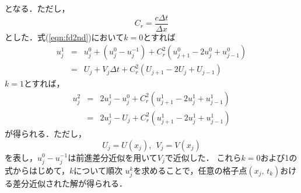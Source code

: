 \documentclass[10pt,a4j,dvipdfmx]{jarticle}
\begin{document}
となる．ただし，
\begin{equation}
	C_r=\frac{c \Delta t}{\Delta x}
	\label{eqn:}
\end{equation}
とした．式(\ref{eqn:fd2nd})において$k=0$とすれば
\begin{eqnarray}
	u^{1}_j 
	&=& 
	u^0_j+\left(u^0_j- u^{-1}_j\right)
	+C_r^2 \left( 
		u_{j+1}^0-2u_j^0 +u_{j-1}^0
	\right) \\ 
	&=&
	U_j+V_j\Delta t +C_r^2 \left( 
		U_{j+1}-2U_j +U_{j-1}
	\right) 
	\label{eqn:fd2nd_k0}
\end{eqnarray}
$k=1$とすれば，
\begin{eqnarray}
	u^{2}_j 
	&=& 
	2u^1_j- u^{0}_j
	+C_r^2 \left( 
		u_{j+1}^1-2u_j^1 +u_{j-1}^1
	\right)\\ 
	&=&
	2u^1_j- U_j
	+C_r^2 \left( 
		u_{j+1}^1-2u_j^1 +u_{j-1}^1
	\right) 
	\label{eqn:fd2nd_k0}
\end{eqnarray}
が得られる．ただし，
\begin{equation}
	U_j=U(x_j), \ \ V_j=V(x_j)
	\label{eqn:}
\end{equation}
を表し，$u^0_j-u^{-1}_j$は前進差分近似を用いて$V_j$で近似した．
これら$k=0$および1の式からはじめて，$k$について順次
$u^k_j$を求めることで，任意の格子点$(x_j,\,t_k)$おける差分近似された解が得られる．
\end{document}
